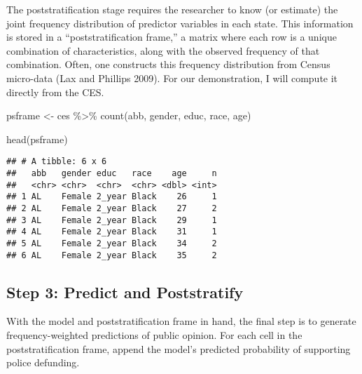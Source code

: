 \documentclass[
]{article}
\newenvironment{Shaded}{\begin{snugshade}}{\end{snugshade}}
\newcommand{\AttributeTok}[1]{\textcolor[rgb]{0.77,0.63,0.00}{#1}}
\newcommand{\FunctionTok}[1]{\textcolor[rgb]{0.00,0.00,0.00}{#1}}
\newcommand{\NormalTok}[1]{#1}
\newcommand{\OtherTok}[1]{\textcolor[rgb]{0.56,0.35,0.01}{#1}}
\newcommand{\SpecialCharTok}[1]{\textcolor[rgb]{0.00,0.00,0.00}{#1}}
\newcommand{\StringTok}[1]{\textcolor[rgb]{0.31,0.60,0.02}{#1}}
\begin{document}
The poststratification stage requires the researcher to know (or
estimate) the joint frequency distribution of predictor variables in
each state. This information is stored in a ``poststratification
frame,'' a matrix where each row is a unique combination of
characteristics, along with the observed frequency of that combination.
Often, one constructs this frequency distribution from Census micro-data
(Lax and Phillips 2009). For our demonstration, I will compute it
directly from the CES.

\begin{Shaded}
\begin{Highlighting}[]
\NormalTok{psframe }\OtherTok{\textless{}{-}}\NormalTok{ ces }\SpecialCharTok{\%\textgreater{}\%} 
  \FunctionTok{count}\NormalTok{(abb, gender, educ, race, age)}

\FunctionTok{head}\NormalTok{(psframe)}
\end{Highlighting}
\end{Shaded}

\begin{verbatim}
## # A tibble: 6 x 6
##   abb   gender educ   race    age     n
##   <chr> <chr>  <chr>  <chr> <dbl> <int>
## 1 AL    Female 2_year Black    26     1
## 2 AL    Female 2_year Black    27     2
## 3 AL    Female 2_year Black    29     1
## 4 AL    Female 2_year Black    31     1
## 5 AL    Female 2_year Black    34     2
## 6 AL    Female 2_year Black    35     2
\end{verbatim}

\hypertarget{step-3-predict-and-poststratify}{%
\subsection{Step 3: Predict and
Poststratify}\label{step-3-predict-and-poststratify}}

With the model and poststratification frame in hand, the final step is
to generate frequency-weighted predictions of public opinion. For each
cell in the poststratification frame, append the model's predicted
probability of supporting police defunding.

\begin{Shaded}
\end{Shaded}
\end{document}
